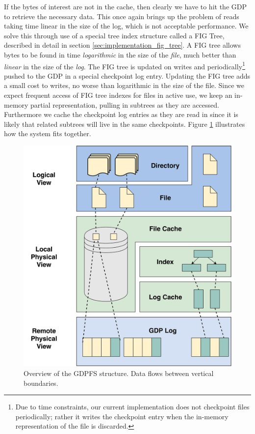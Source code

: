 \documentclass{acm_proc_article-sp}
\begin{document}
If the bytes of interest are not in the cache, then clearly we have to hit the GDP to retrieve the necessary data. This once again brings up the problem of reads taking time linear in the size of the log, which is not acceptable performance. We solve this through use of a special tree index structure called a FIG Tree, described in detail in section \ref{sec:implementation_fig_tree}. A FIG tree allows bytes to be found in time \emph{logarithmic} in the size of the \emph{file}, much better than \emph{linear} in the size of the \emph{log}. The FIG tree is updated on writes and periodically\footnote{Due to time constraints, our current implementation does not checkpoint files periodically; rather it writes the checkpoint entry when the in-memory representation of the file is discarded.} pushed to the GDP in a special checkpoint log entry. Updating the FIG tree adds a small cost to writes, no worse than logarithmic in the size of the file. Since we expect frequent access of FIG tree indexes for files in active use, we keep an in-memory partial representation, pulling in subtrees as they are accessed. Furthermore we cache the checkpoint log entries as they are read in since it is likely that related subtrees will live in the same checkpoints. Figure \ref{fig:gdpfs_overview} illustrates how the system fits together.

\begin{figure}[t]
\includegraphics[width=\columnwidth]{gdpfs_overview}
\caption{Overview of the GDPFS structure. Data flows between vertical boundaries.\label{fig:gdpfs_overview}}
\end{figure} 
\end{document}
